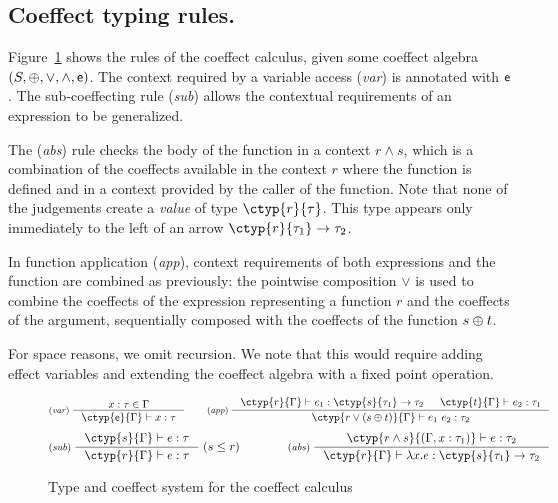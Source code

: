 
\vspace{-1em}
\subsection{Coeffect typing rules.}
Figure~\ref{fig:coeffect-typing} shows the
rules of the coeffect calculus, given some coeffect algebra $(S, \oplus, \vee, \wedge, \mathsf{e})$.
The context required by a variable access (\emph{var}) is annotated with $\mathsf{e}$.
The sub-coeffecting rule (\emph{sub}) allows the contextual requirements of an expression 
to be generalized.

The (\emph{abs}) rule checks the body of the function in a context $r \wedge s$, which is a 
combination of the coeffects available in the context $r$ where the function is 
defined and in a context provided by the caller of the function. 
Note that none of the judgements create a \emph{value} of type $\ctyp{r}{\tau}$. This
type appears only immediately to the left of  an arrow $\ctyp{r}{\tau_1} \rightarrow \tau_2$.

In function application (\emph{app}), context requirements of both expressions and the 
function are combined as previously: the pointwise composition $\vee$ is used to combine
the coeffects of the expression representing a function $r$ and the coeffects of
the argument, sequentially composed with the coeffects of the function $s \oplus t$.

For space reasons, we omit recursion. We note that this would require adding
effect variables and extending the coeffect algebra with a fixed point operation.


\begin{figure}[t]
\vspace{-1em}
\begin{equation*}
\inference[(\emph{var})\;]
  {x : \tau \in \Gamma}
  {\ctyp{\iunit}{\Gamma} \vdash x : \tau }
%
\quad\quad
%
\inference[(\emph{app})\;]
  {\ctyp{r}{\Gamma} \vdash e_1 : \ctyp{s}{\tau_1} \rightarrow \tau_2 &
   \ctyp{t}{\Gamma} \vdash e_2 : \tau_1 }
  {\ctyp{r \vee (s \imult t)}{\Gamma} \vdash e_1~e_2 : \tau_2}
\end{equation*}
\begin{equation*}
\inference[(\emph{sub})\;]
  {\ctyp{s}{\Gamma} \vdash e : \tau }
  {\ctyp{r}{\Gamma} \vdash e : \tau }
\;(s\leq r)  
%
\quad\quad\quad\quad
%
\inference[(\emph{abs})\;]
  {\ctyp{r \wedge s}{(\Gamma, x:\tau_1)} \vdash e : \tau_2}
  {\ctyp{r}{\Gamma} \vdash \lambda x.e : \ctyp{s}{\tau_1} \rightarrow \tau_2 }
\end{equation*}
\caption{Type and coeffect system for the coeffect calculus}
\label{fig:coeffect-typing}
\vspace{-1em}
\end{figure}

